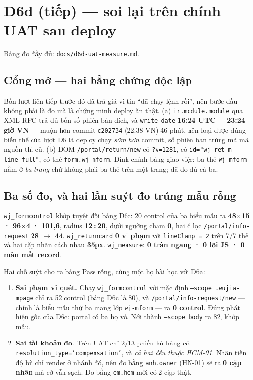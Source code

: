 \section{D6d (tiếp) --- soi lại trên chính UAT sau deploy}

Bảng đo đầy đủ: \texttt{docs/d6d-uat-measure.md}.

\subsection*{Cổng mở --- hai bằng chứng độc lập}

Bốn lượt liên tiếp trước đó đã trả giá vì tin ``đã chạy lệnh rồi'', nên bước đầu không phải là đo
mà là chứng minh deploy ăn thật. (a) \texttt{ir.module.module} qua XML-RPC trả đủ bốn số phiên bản
đích, và \texttt{write\_date} \textbf{16:24 UTC = 23:24 giờ VN} --- muộn hơn commit \texttt{c202734}
(22:38 VN) 46 phút, nên loại được đúng biến thể của lượt D6 là deploy chạy \emph{sớm hơn} commit,
số phiên bản trùng mà mã nguồn thì cũ. (b) DOM \texttt{/portal/return/new} có \texttt{?v=1281},
có \texttt{id="wj-ret-m-line-full"}, có thẻ \texttt{form.wj-mform}. Đính chính bảng giao việc: ba
thẻ \texttt{wj-mform} nằm ở \emph{ba trang} chứ không phải ba thẻ trên một trang; đã đo đủ cả ba.

\subsection*{Ba số đo, và hai lần suýt đo trúng mẫu rỗng}

\texttt{wj\_formcontrol} khớp tuyệt đối bảng D6c: 20 control của ba biểu mẫu ra
\textbf{48$\times$15 · 96$\times$4 · 101,6}, radius \textbf{12$\times$20}, dưới ngưỡng chạm
\textbf{0}, hai ô lọc \texttt{/portal/info-request} \textbf{28 $\to$ 44}. \texttt{wj\_returncard}
\textbf{0 vi phạm} với \texttt{lineClamp = 2} trên 7/7 thẻ và hai cặp nhãn cách nhau
\textbf{35px}. \texttt{wj\_measure}: \textbf{0 tràn ngang · 0 lỗi JS · 0 màn mất record}.

Hai chỗ suýt cho ra bảng Pass rỗng, cùng một họ bài học với D6a:

\begin{enumerate}
\item \textbf{Sai phạm vi quét.} Chạy \texttt{wj\_formcontrol} với mặc định
  \texttt{--scope .wujia-mpage} chỉ ra 52 control (bảng D6c là 80), và \texttt{/portal/info-request/new}
  --- chính là biểu mẫu thứ ba mang lớp \texttt{wj-mform} --- ra \textbf{0 control}. Đúng phát hiện
  gốc của D6c: portal có ba họ vỏ. Nới thành \texttt{--scope body} ra 82, khớp mẫu.
\item \textbf{Sai tài khoản đo.} Trên UAT chỉ 2/13 phiếu bù hàng có
  \texttt{resolution\_type='compensation'}, và \emph{cả hai đều thuộc HCM-01}. Nhãn tiến độ bù chỉ
  render ở nhánh đó, nên đo bằng \texttt{anh.owner} (HN-01) sẽ ra \textbf{0 cặp nhãn} mà cờ vẫn
  sạch. Đo bằng \texttt{em.hcm} mới có 2 cặp thật.
\end{enumerate}

